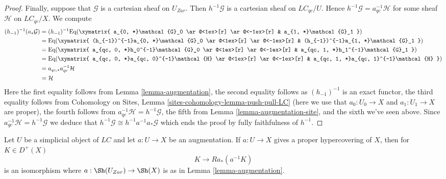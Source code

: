 \begin{proof}
\medskip\noindent
Finally, suppose that $\mathcal{G}$ is a cartesian sheaf on $U_{Zar}$.
Then $h^{-1}\mathcal{G}$ is a cartesian sheaf on $\textit{LC}_{qc}/U$.
Hence $h^{-1}\mathcal{G} = a_{qc}^{-1}\mathcal{H}$ for some sheaf
$\mathcal{H}$ on $\textit{LC}_{qc}/X$.
We compute
\begin{align*}
(h_{-1})^{-1}(a_*\mathcal{G})
& =
(h_{-1})^{-1}
\text{Eq}(
\xymatrix{
a_{0, *}\mathcal{G}_0
\ar@<1ex>[r] \ar@<-1ex>[r] &
a_{1, *}\mathcal{G}_1
}
) \\
& =
\text{Eq}(
\xymatrix{
(h_{-1})^{-1}a_{0, *}\mathcal{G}_0
\ar@<1ex>[r] \ar@<-1ex>[r] &
(h_{-1})^{-1}a_{1, *}\mathcal{G}_1
}
) \\
& =
\text{Eq}(
\xymatrix{
a_{qc, 0, *}h_0^{-1}\mathcal{G}_0
\ar@<1ex>[r] \ar@<-1ex>[r] &
a_{qc, 1, *}h_1^{-1}\mathcal{G}_1
}
) \\
& =
\text{Eq}(
\xymatrix{
a_{qc, 0, *}a_{qc, 0}^{-1}\mathcal{H}
\ar@<1ex>[r] \ar@<-1ex>[r] &
a_{qc, 1, *}a_{qc, 1}^{-1}\mathcal{H}
}
) \\
& =
a_{qc, *}a_{qc}^{-1}\mathcal{H} \\
& =
\mathcal{H}
\end{align*}
Here the first equality follows from Lemma \ref{lemma-augmentation},
the second equality follows as $(h_{-1})^{-1}$ is an exact functor,
the third equality follows from
Cohomology on Sites, Lemma \ref{sites-cohomology-lemma-push-pull-LC}
(here we use that $a_0 : U_0 \to X$ and $a_1: U_1 \to X$ are proper),
the fourth follows from $a_{qc}^{-1}\mathcal{H} = h^{-1}\mathcal{G}$,
the fifth from Lemma \ref{lemma-augmentation-site}, and the
sixth we've seen above. Since $a_{qc}^{-1}\mathcal{H} = h^{-1}\mathcal{G}$
we deduce that $h^{-1}\mathcal{G} \cong h^{-1}a^{-1}a_*\mathcal{G}$
which ends the proof by fully faithfulness of $h^{-1}$.
\end{proof}

\begin{lemma}
\label{lemma-cohomological-descent-for-proper-hypercovering}
Let $U$ be a simplicial object of $\textit{LC}$ and let $a : U \to X$
be an augmentation. If $a : U \to X$ gives a proper hypercovering of $X$,
then for $K \in D^+(X)$
$$
K \to Ra_*(a^{-1}K)
$$
is an isomorphism where $a : \Sh(U_{Zar}) \to \Sh(X)$ is as in
Lemma \ref{lemma-augmentation}.
\end{lemma}

